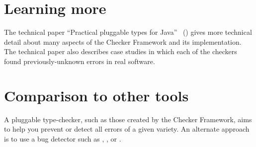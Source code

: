 % 
% 
% 
% 
% 
% 
% 



\section{Learning more\label{learning-more}}

The technical paper ``Practical pluggable types for Java''~\cite{PapiACPE2008}
()
gives more technical detail about many
aspects of the Checker Framework and its implementation.
%
The technical
paper also describes case
studies in which each of the checkers found
previously-unknown errors in real software.


\section{Comparison to other tools\label{other-tools}}

A pluggable type-checker, such as those created by the Checker Framework,
aims to help you prevent or detect all errors of a given variety.  An
alternate approach is to use a bug detector such as
,
, or
.

